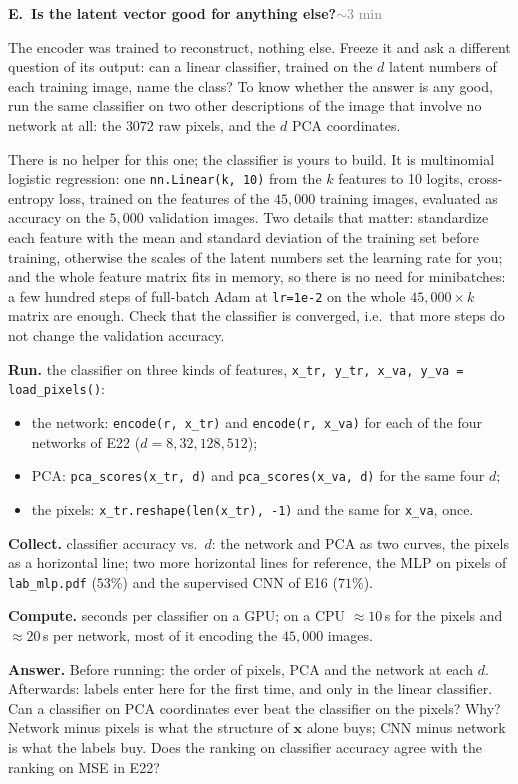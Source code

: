 \documentclass[11pt]{article}
\newcommand{\code}[1]{\texttt{#1}}
\newcounter{exp}
\newenvironment{experiment}[2]{\refstepcounter{exp}\par\medskip
  \textbf{\textcolor{aiblue}{E\theexp.\ #1}}\hfill{\small\textcolor{gray}{#2}}\par}{\par}
\newcommand{\run}[1]{\textbf{Run.} #1\par}
\newcommand{\collect}[1]{\textbf{Collect.} #1\par}
\newcommand{\answer}[1]{\textbf{Answer.} #1\par}
\newcommand{\heavy}[1]{\textcolor{gray!70!black}{\textbf{Compute.} #1}\par}
\begin{document}
\begin{experiment}{Is the latent vector good for anything else?}{$\sim$3 min}
The encoder was trained to reconstruct, nothing else. Freeze it and ask a different question of its output: can a linear classifier, trained on the $d$ latent numbers of each training image, name the class? To know whether the answer is any good, run the same classifier on two other descriptions of the image that involve no network at all: the $3072$ raw pixels, and the $d$ PCA coordinates.

There is no helper for this one; the classifier is yours to build. It is multinomial logistic regression: one \code{nn.Linear(k, 10)} from the $k$ features to 10 logits, cross-entropy loss, trained on the features of the $45{,}000$ training images, evaluated as accuracy on the $5{,}000$ validation images. Two details that matter: standardize each feature with the mean and standard deviation of the training set before training, otherwise the scales of the latent numbers set the learning rate for you; and the whole feature matrix fits in memory, so there is no need for minibatches: a few hundred steps of full-batch Adam at \code{lr=1e-2} on the whole $45{,}000\times k$ matrix are enough. Check that the classifier is converged, i.e.\ that more steps do not change the validation accuracy.

\run{the classifier on three kinds of features, \code{x\_tr, y\_tr, x\_va, y\_va = load\_pixels()}:
\begin{itemize}
  \item the network: \code{encode(r, x\_tr)} and \code{encode(r, x\_va)} for each of the four networks of E22 ($d=8,32,128,512$);
  \item PCA: \code{pca\_scores(x\_tr, d)} and \code{pca\_scores(x\_va, d)} for the same four $d$;
  \item the pixels: \code{x\_tr.reshape(len(x\_tr), -1)} and the same for \code{x\_va}, once.
\end{itemize}}
\collect{classifier accuracy vs.\ $d$: the network and PCA as two curves, the pixels as a horizontal line; two more horizontal lines for reference, the MLP on pixels of \code{lab\_mlp.pdf} ($53\%$) and the supervised CNN of E16 ($71\%$).}
\heavy{seconds per classifier on a GPU; on a CPU $\approx10$\,s for the pixels and $\approx20$\,s per network, most of it encoding the $45{,}000$ images.}
\answer{Before running: the order of pixels, PCA and the network at each $d$. Afterwards: labels enter here for the first time, and only in the linear classifier. Can a classifier on PCA coordinates ever beat the classifier on the pixels? Why? Network minus pixels is what the structure of $\mathbf x$ alone buys; CNN minus network is what the labels buy. Does the ranking on classifier accuracy agree with the ranking on MSE in E22?}
\end{experiment}
\end{document}

